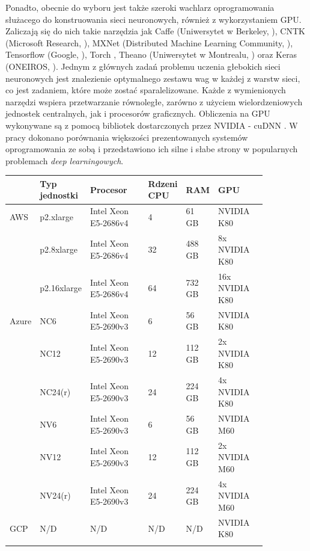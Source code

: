 \documentclass[12pt,a4paper,twoside]{article}
\begin{document}
Ponadto, obecnie do wyboru jest także szeroki wachlarz oprogramowania służacego do konstruowania sieci neuronowych, również z wykorzystaniem GPU. Zaliczają się do nich takie narzędzia jak Caffe (Uniwersytet w Berkeley, \citet{jia2014}), CNTK (Microsoft Research, \citet{yu2014}), MXNet (Distributed Machine Learning Community, \citet{chen2015}), Tensorflow (Google, \citet{abadi2016}), Torch \citep{collobert2011}, Theano (Uniwersytet w Montrealu, \citet{alrfou2016}) oraz Keras (ONEIROS, \citet{chollet2015}). Jednym z głównych zadań problemu uczenia głebokich sieci neuronowych jest znalezienie optymalnego zestawu wag w każdej z warstw sieci, co jest zadaniem, które może zostać sparalelizowane. Każde z wymienionych narzędzi wspiera przetwarzanie równoległe, zarówno z użyciem wielordzeniowych jednostek centralnych, jak i procesorów graficznych. Obliczenia na GPU wykonywane są z pomocą bibliotek dostarczonych przez NVIDIA - cuDNN \citep{chetlur2014}.
W pracy \citet{shi2016} dokonano porównania większości prezentowanych systemów oprogramowania ze sobą i przedstawiono ich silne i słabe strony w popularnych problemach \textit{deep learningowych}.

\noindent
\begin{tabular}
  {p{0.08\linewidth}
  p{0.15\linewidth}
  p{0.24\linewidth}
  p{0.08\linewidth}
  p{0.10\linewidth}
  p{0.20\linewidth}}
\toprule
 & Typ jednostki & Procesor & Rdzeni CPU & RAM & GPU \\
\midrule
AWS & p2.xlarge & Intel Xeon E5-2686v4 & 4 & 61 GB & NVIDIA K80 \\
    & p2.8xlarge & Intel Xeon E5-2686v4 & 32 & 488 GB & 8x NVIDIA K80 \\
    & p2.16xlarge & Intel Xeon E5-2686v4 & 64 & 732 GB & 16x NVIDIA K80 \\
\midrule
Azure & NC6 & Intel Xeon E5-2690v3 & 6 & 56 GB & NVIDIA K80 \\
      & NC12 & Intel Xeon E5-2690v3 & 12 & 112 GB & 2x NVIDIA K80 \\
      & NC24(r) & Intel Xeon E5-2690v3 & 24 & 224 GB & 4x NVIDIA K80 \\
      & NV6 & Intel Xeon E5-2690v3 & 6 & 56 GB & NVIDIA M60 \\
      & NV12 & Intel Xeon E5-2690v3 & 12 & 112 GB & 2x NVIDIA M60 \\
      & NV24(r) & Intel Xeon E5-2690v3 & 24 & 224 GB & 4x NVIDIA M60 \\
\midrule
GCP & N/D & N/D & N/D & N/D & NVIDIA K80 \\
\bottomrule
\label{tab:gpu_units}
\end{tabular}
\end{document}
